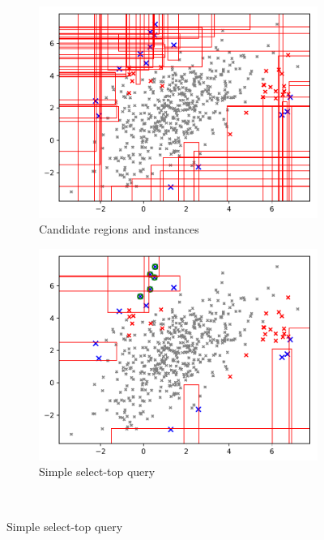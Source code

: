 \documentclass{article} %
\begin{document}
\begin{figure}
	\centering
	\begin{subfigure}[b]{0.48\textwidth}
		\includegraphics[width=\textwidth]{query_candidate_regions_ntop5_100_trees}
		\caption{Candidate regions and instances}
		\label{fig:candidate_regions}
	\end{subfigure}
	\begin{subfigure}[b]{0.48\textwidth}
		\includegraphics[width=\textwidth]{query_compact_ntop5_100_trees_baseline}
		\caption{Simple select-top query}
		\label{fig:baseline_queries}
	\end{subfigure} \\

\end{figure}
\end{document}
